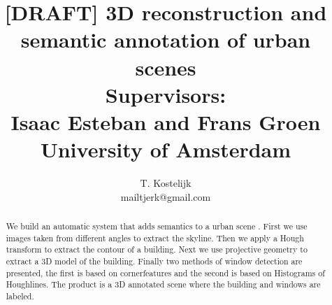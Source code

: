 \documentclass[11pt]{article}
\title{\textbf{[DRAFT]} {\sc 3D reconstruction and semantic annotation of urban
scenes}\\
Supervisors:\\
 Isaac Esteban and Frans Groen\\
 University of Amsterdam\\
 }
\author{T. Kostelijk\\mailtjerk@gmail.com}
\begin{document}
\maketitle
\newpage
\setcounter{tocdepth}{2}
\tableofcontents

\newpage
\begin{abstract}
We build an automatic system that adds semantics to a urban scene .  First we
use images taken from different angles to extract the skyline. Then we apply a
Hough transform to extract the contour of a building. Next we use projective
geometry to extract a 3D model of the building. Finally two methods of window
detection are presented, the first is based on cornerfeatures and the second is
based on Histograms of Houghlines.  The product is a 3D annotated scene where the
building and windows are labeled.\\
\end{abstract}
\end{document}
